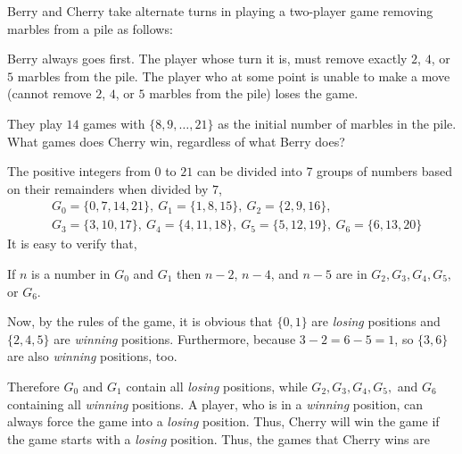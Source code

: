 \begin{multicols}{2}
	\begin{example*}[Winning positions]
		
		Berry and Cherry take alternate turns in playing a two-player game removing marbles from a pile as follows:
		\begin{itemize}[topsep=0pt, partopsep=0pt, itemsep=0pt]
			\ii Berry always goes first.
			\ii The player whose turn it is, must remove exactly $2$, $4$, or $5$ marbles from the pile.
			\ii The player who at some point is unable to make a move (cannot remove $2$, $4$, or $5$ marbles from the pile) loses the game.
		\end{itemize}
		They play $14$ games with $\{8, 9, \ldots, 21\}$ as the initial number of marbles in the pile.
		What games does Cherry win, regardless of what Berry does?
	\end{example*}
	
	\begin{soln}
		The positive integers from $0$ to $21$ can be divided into 7 groups of numbers based on their remainders when divided by $7$,
		\[
		\begin{aligned}
			&G_0=\{0,7,14,21\},\ G_1=\{1,8,15\},\ G_2=\{2,9,16\},\\
			&G_3=\{3,10,17\},\ G_4=\{4,11,18\},\ G_5=\{5,12,19\},\ G_6=\{6,13,20\}
		\end{aligned}
		\]
		It is easy to verify that,
		\begin{claim*}
			If $n$ is a number in $G_0$ and $G_1$ then $n-2$, $n-4$, and $n-5$ are in $G_2,G_3,G_4,G_5,$ or $G_6$.
		\end{claim*}
		Now, by the rules of the game, it is obvious that $\{0, 1\}$ are \textit{losing} positions and $\{2,4,5\}$ are \textit{winning} positions.
		Furthermore, because $3-2=6-5=1$, so $\{3,6\}$ are also \textit{winning} positions, too.
		
		Therefore $G_0$ and $G_1$ contain all \textit{losing} positions, while $G_2,G_3,G_4,G_5,$ and $G_6$ containing all \textit{winning} positions.
		A player, who is in a \textit{winning} position, can always force the game into a \textit{losing} position.
		Thus, Cherry will win the game if the game starts with a \textit{losing} position.
		Thus, the games that Cherry wins are 
	\end{soln}
	
\end{multicols}
